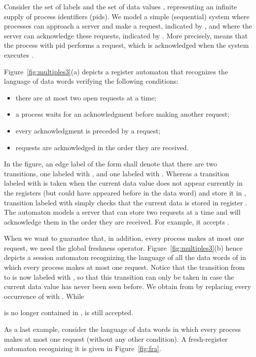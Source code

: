 \documentclass{LMCS}
\def\figurename{Figure}
\begin{document}
\begin{exa}\label{ex:req-ack}
  Consider the set of labels  and the set of
  data values , representing an infinite supply of process
  identifiers (pids). We model a simple (sequential) system where
  processes can approach a server and make a request, indicated by
  , and where the server can acknowledge these requests,
  indicated by . More precisely,  means that the process with pid  performs a request, which is
  acknowledged when the system executes .

  \figurename~\ref{fig:multiples3}(a) depicts a register
  automaton that recognizes the language  of data words verifying
  the following conditions:
  \begin{itemize}
  \item there are at most two open requests at a time;
  \item a process waits for an acknowledgment before making another request;
  \item every acknowledgment is preceded by a request;
  \item requests are acknowledged in the order they are received.
  \end{itemize}
  In the figure, an edge label of the form  shall denote that there are two transitions, one
  labeled with , and one labeled with
  . Whereas a transition labeled with
   is taken when the current data value does not
  appear currently in the registers (but could have appeared before in
  the data word) and store it in , transition labeled with
   simply checks that the current data is stored in
  register . The automaton models a server that can store two
  requests at a time and will acknowledge them in the order they are
  received. For example, it accepts
  .

  When we want to guarantee that, in addition, every process makes at most one request, we
  need the global freshness
  operator. \figurename~\ref{fig:multiples3}(b)
  hence depicts a session automaton recognizing the language  of
  all the data words of  in which every process makes at most one
  request. Notice that the transition from  to  is now
  labeled with , so that this transition can only
  be taken in case the current data value has never been seen
  before. We obtain  from  by replacing every occurrence
  of  with . While
  
  is no longer contained in , 
   is still accepted.

  As a last example, consider the language  of data words in
  which every process makes at most one request (without any other
  condition). A fresh-register automaton recognizing it is given in
  \figurename~\ref{fig:fra}.


\end{exa}
\end{document}
